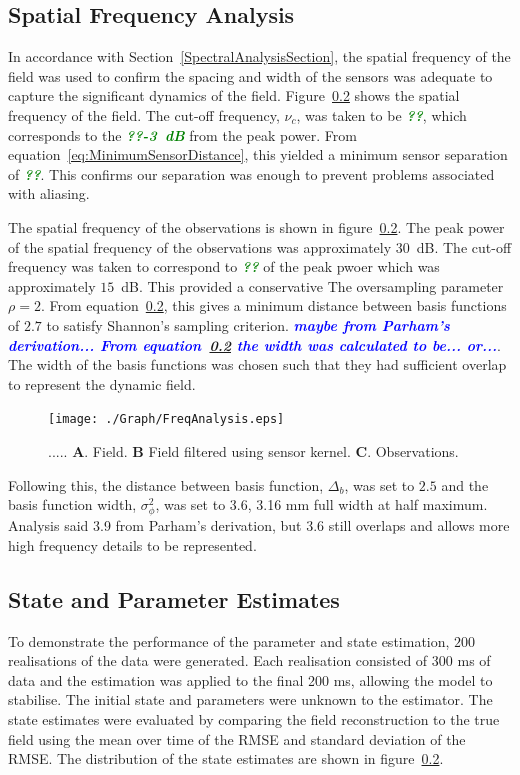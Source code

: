 \documentclass[12pt]{iopart}
\newcommand{\todo}[1]{\textsf{\emph{\textbf{\textcolor{blue}{#1}}}}}
\newcommand{\omg}[1]{\textsf{\emph{\textbf{\textcolor{green}{#1}}}}}
\begin{document}
\subsection{Spatial Frequency Analysis} In accordance with Section~\ref{SpectralAnalysisSection}, the spatial frequency of the field was used to confirm the spacing and width of the sensors was adequate to capture the significant dynamics of the field. Figure~\ref{} shows the spatial frequency of the field. The cut-off frequency, $\nu_c$, was taken to be \omg{??}, which corresponds to the \omg{??-3~dB} from the peak power. From equation~\ref{eq:MinimumSensorDistance}, this yielded a minimum sensor separation of \omg{??}. This confirms our separation was enough to prevent problems associated with aliasing.

The spatial frequency of the observations is shown in figure~\ref{}. The peak power of the spatial frequency of the observations was approximately $30$~dB. The cut-off frequency was taken to correspond to \omg{??} of the peak pwoer which was approximately $15$~dB. This provided a conservative The oversampling parameter $\rho=2$. From equation~\ref{}, this gives a minimum distance between basis functions of $2.7$ to satisfy Shannon's sampling criterion. \todo{maybe from Parham's derivation... From equation~\ref{} the width was calculated to be... or...}. The width of the basis functions was chosen such that they had sufficient overlap to represent the dynamic field.
\begin{figure}
	\begin{center}
		\texttt{[image: ./Graph/FreqAnalysis.eps]}
	\end{center}
	\caption{..... \textbf{A}. Field. \textbf{B} Field filtered using sensor kernel. \textbf{C}. Observations.} \label{fig:FreqAnalysis} 
\end{figure}
Following this, the distance between basis function, $\Delta_b$, was set to $2.5$ and the basis function width, $\sigma_{\phi}^2$, was set to 3.6, 3.16 mm full width at half maximum. Analysis said 3.9 from Parham's derivation, but 3.6 still overlaps and allows more high frequency details to be represented.

\subsection{State and Parameter Estimates} To demonstrate the performance of the parameter and state estimation, $200$ realisations of the data were generated. Each realisation consisted of 300 ms of data and the estimation was applied to the final 200 ms, allowing the model to stabilise. The initial state and parameters were unknown to the estimator. The state estimates were evaluated by comparing the field reconstruction to the true field using the mean over time of the RMSE and standard deviation of the RMSE. The distribution of the state estimates are shown in figure~\ref{}. 
\end{document}
